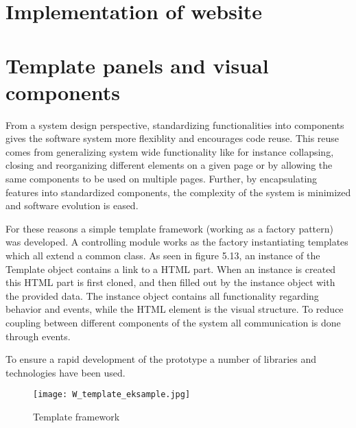 \section{Implementation of website}
\section*{Template panels and visual components}
From a system design perspective, standardizing functionalities into components gives the software system more flexiblity and encourages code reuse. This reuse comes from generalizing system wide functionality like for instance collapsing, closing and reorganizing different elements on a given page or by allowing the same components to be used on multiple pages. Further, by encapsulating features into standardized components, the complexity of the system is minimized and software evolution is eased.

For these reasons a simple template framework (working as a factory pattern) was developed. A controlling module works as the factory instantiating templates which all extend a common class. As seen in figure 5.13, an instance of the Template object contains a link to a HTML part. When an instance is created this HTML part is first cloned, and then filled out by the instance object with the provided data. The instance object contains all functionality regarding behavior and events, while the HTML element is the visual structure. To reduce coupling between different components of the system all communication is done through events.

To ensure a rapid development of the prototype a number of libraries and technologies have been used.
\begin{figure}
\begin{center}
\texttt{[image: W\_template\_eksample.jpg]}
\end{center}
\caption{Template framework}
\end{figure}
